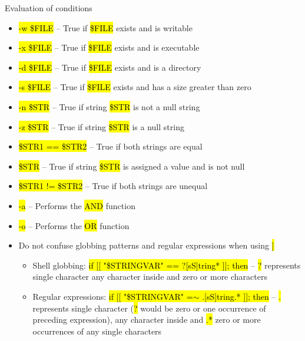 \documentclass[compress, ucs, xelatex, 11pt, xcolor=svgnames,
  hyperref={
    bookmarks=true,
    unicode=true,
    colorlinks=true,
    pdftitle={Linux, command line and MetaCentrum},
    plainpages=false,
    pdfauthor={Vojtech Zeisek},
    pdfsubject={Course about use of Linux command line, writing shell scripts and using MetaCentrum of CESNET},
    pdfcreator={XeLaTeX},
    pdfkeywords={Linux, GNU, BASH, shell, command line, MetaCentrum},
    linkcolor=DarkRed,
    anchorcolor=DarkBlue,
    citecolor=Indigo,
    filecolor=NavyBlue,
    menucolor=DarkMagenta,
    urlcolor=DarkBlue,
    pdftex},
  url={hyphens, lowtilde} %
  ]{beamer}
\renewcommand{\texttt}[1]{\hl{\ttfamily #1}}
\begin{document}
\begin{frame}[allowframebreaks]{Evaluation of conditions}
\begin{itemize}
    \item \texttt{-w \$FILE} -- True if \texttt{\$FILE} exists and is writable
    \item \texttt{-x \$FILE} -- True if \texttt{\$FILE} exists and is executable
    \item \texttt{-d \$FILE} -- True if \texttt{\$FILE} exists and is a directory
    \item \texttt{-s \$FILE} -- True if \texttt{\$FILE} exists and has a size greater than zero
    \item \texttt{-n \$STR} -- True if string \texttt{\$STR} is not a null string
    \item \texttt{-z \$STR} -- True if string \texttt{\$STR} is a null string
    \item \texttt{\$STR1 == \$STR2} -- True if both strings are equal
    \item \texttt{\$STR} -- True if string \texttt{\$STR} is assigned a value and is not null
    \item \texttt{\$STR1 != \$STR2} -- True if both strings are unequal
    \item \texttt{-a} -- Performs the \texttt{AND} function
    \item \texttt{-o} -- Performs the \texttt{OR} function
    \item Do not confuse globbing patterns and regular expressions when using \texttt{[[ \ldots~]]}
    \begin{itemize}
      \item Shell globbing: \texttt{if [[ "\$STRINGVAR" == ?[sS]tring* ]]; then} -- \texttt{?} represents single character \texttt{[]} any character inside and \texttt{*} zero or more characters
      \item Regular expressions: \texttt{if [[ "\$STRINGVAR" =$\sim$ .[sS]tring.* ]]; then} -- \texttt{.} represents single character (\texttt{?} would be zero or one occurrence of preceding expression), \texttt{[]} any character inside and \texttt{.*} zero or more occurrences of any single characters
    \end{itemize}
  \end{itemize}
\end{frame}
\end{document}
